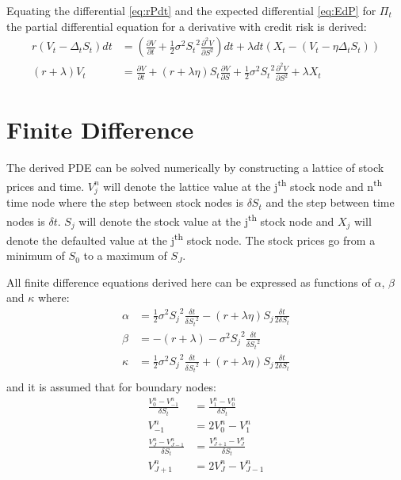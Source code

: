 \documentclass[a4paper,11pt,oneside]{report}
\theoremstyle{plain}
\theoremstyle{definition}
\def\n{\nonumber\\}
\def\S{\ensuremath{S_t}\xspace}
\def\dt{\ensuremath{dt}\xspace}
\def\Vt{\frac{\partial V}{\partial t}}
\def\Vs{\frac{\partial V}{\partial S}}
\def\Vss{\frac{\partial^2 V}{\partial S^2}}
\def\DS{\ensuremath{\delta S_t}\xspace}
\def\Dt{\ensuremath{\delta t}\xspace}
\def\Vjn{\ensuremath{V^{n}_j}\xspace}
\def\Von{\ensuremath{V^{n}_{0}\xspace}}
\def\Vomn{\ensuremath{V^{n}_{-1}\xspace}}
\def\Vopn{\ensuremath{V^{n}_{1}\xspace}}
\def\VJn{\ensuremath{V^{n}_{J}\xspace}}
\def\VJmn{\ensuremath{V^{n}_{J - 1}\xspace}}
\def\VJpn{\ensuremath{V^{n}_{J + 1}\xspace}}
\def\Sz{\ensuremath{S_0}\xspace}
\def\Sj{\ensuremath{S_j}\xspace}
\def\SJ{\ensuremath{S_J}\xspace}
\def\Xj{\ensuremath{X_j}\xspace}
\def\V{\ensuremath{V_t}\xspace}
\def\X{\ensuremath{X_t}\xspace}
\def\P{\ensuremath{\Pi_t}\xspace}
\def\D{\ensuremath{\Delta_t}\xspace}
\def\th{\textsuperscript{th}\xspace}
\def\half{\tfrac{1}{2}}
\begin{document}
Equating the differential \eqref{eq:rPdt} and the expected differential \eqref{eq:EdP} for \P the partial differential equation for a derivative with credit risk is derived:
\begin{align}
 r(\V - \D\S)\dt &= \left(\Vt + \half\sigma^2\S^2\Vss\right)\dt + \lambda\dt(\X - (\V - \eta\D\S)) \n
 (r + \lambda)\V &= \Vt + (r + \lambda\eta)\S\Vs + \half\sigma^2\S^2\Vss + \lambda\X
\end{align}


\section{Finite Difference}
The derived PDE can be solved numerically by constructing a lattice of stock prices and time.  \Vjn will denote the lattice value at the j\th stock node and n\th time node where the step between stock nodes is \DS and the step between time nodes is \Dt.  \Sj will denote the stock value at the j\th stock node and \Xj will denote the defaulted value at the j\th stock node.  The stock prices go from a minimum of \Sz to a maximum of \SJ.

All finite difference equations derived here can be expressed as functions of $\alpha$, $\beta$ and $\kappa$ where:
\begin{align*}
 \alpha &= \half\sigma^2\Sj^2\frac{\Dt}{\DS^2} - (r + \lambda\eta)\Sj\frac{\Dt}{2\DS} \\
 \beta  &= - (r + \lambda) - \sigma^2\Sj^2\frac{\Dt}{\DS^2} \\
 \kappa &= \half\sigma^2\Sj^2\frac{\Dt}{\DS^2} + (r + \lambda\eta)\Sj\frac{\Dt}{2\DS} \\
\end{align*}
and it is assumed that for boundary nodes:
\begin{align*}
 \frac{\Von - \Vomn}{\DS} &= \frac{\Vopn - \Von}{\DS} \\
                    \Vomn &= 2\Von - \Vopn \\
 \frac{\VJn - \VJmn}{\DS} &= \frac{\VJpn - \VJn}{\DS} \\
                    \VJpn &= 2\VJn - \VJmn \\
\end{align*}

\end{document}
